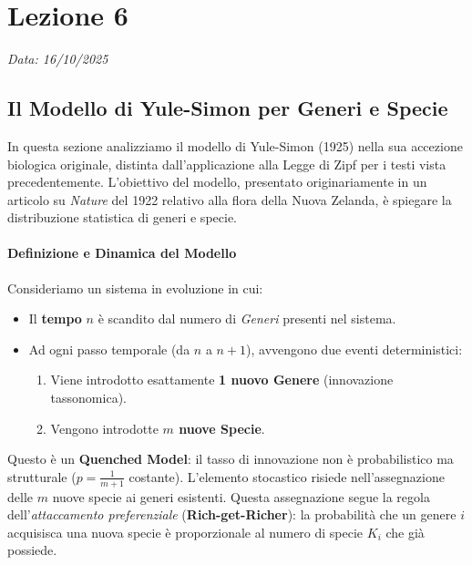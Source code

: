 \chapter{Lezione 6}
\label{chap:lezione_06} 

\begin{flushright}
\textit{Data: 16/10/2025}
\end{flushright}

\section{Il Modello di Yule-Simon per Generi e Specie}

In questa sezione analizziamo il modello di Yule-Simon (1925) nella sua accezione biologica originale, distinta dall'applicazione alla Legge di Zipf per i testi vista precedentemente. L'obiettivo del modello, presentato originariamente in un articolo su \textit{Nature} del 1922 relativo alla flora della Nuova Zelanda, è spiegare la distribuzione statistica di generi e specie.

\subsubsection{Definizione e Dinamica del Modello}
Consideriamo un sistema in evoluzione in cui:
\begin{itemize}
    \item Il \textbf{tempo} $n$ è scandito dal numero di \textit{Generi} presenti nel sistema.
    \item Ad ogni passo temporale (da $n$ a $n+1$), avvengono due eventi deterministici:
    \begin{enumerate}
        \item Viene introdotto esattamente \textbf{1 nuovo Genere} (innovazione tassonomica).
        \item Vengono introdotte \textbf{$m$ nuove Specie}.
    \end{enumerate}
\end{itemize}

\noindent Questo è un \textbf{Quenched Model}: il tasso di innovazione non è probabilistico ma strutturale ($p = \frac{1}{m+1}$ costante).
L'elemento stocastico risiede nell'assegnazione delle $m$ nuove specie ai generi esistenti. Questa assegnazione segue la regola dell'\textit{attaccamento preferenziale} (\textbf{Rich-get-Richer}): la probabilità che un genere $i$ acquisisca una nuova specie è proporzionale al numero di specie $K_i$ che già possiede.

